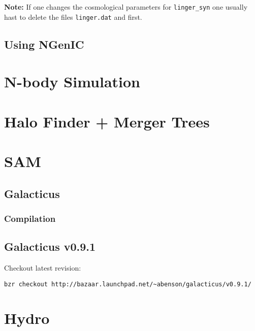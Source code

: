 \documentclass[a4paper,english,10.5pt]{scrartcl}
\begin{document}
\begin{description}
\textbf{Note: } If one changes the cosmological parameters for 
\texttt{linger\_syn} one usually hast to delete the files \texttt{linger.dat} 
and  first. 

\end{description}



\subsection{Using NGenIC}

\section{N-body Simulation}

\section{Halo Finder + Merger Trees}

\section{SAM}
\subsection{Galacticus}
\subsubsection{Compilation}


\subsection{Galacticus v0.9.1}

Checkout latest revision: 
\begin{verbatim}
bzr checkout http://bazaar.launchpad.net/~abenson/galacticus/v0.9.1/
\end{verbatim}

\section{Hydro}


\renewcommand{\bibsection}{\section{References}}
\setlength{\bibhang}{1.24cm}
\setlength{\parindent}{3cm}
\setlength{\bibsep}{0cm}

\gdef\harvardand{\&}
\end{document}
